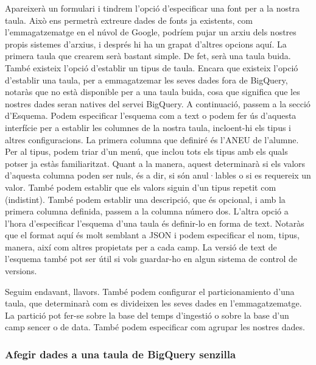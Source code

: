 \documentclass[12pt,longbibliography]{article}
\theoremstyle{definition}
\theoremstyle{remark}
\begin{document}
Apareixerà un formulari i tindrem l'opció d'especificar una font per a la nostra taula. Això ens permetrà extreure dades de fonts ja existents, com l'emmagatzematge en el núvol de Google, podríem pujar un arxiu dels nostres propis sistemes d'arxius, i després hi ha un grapat d'altres opcions aquí. La primera taula que crearem serà bastant simple. De fet, serà una taula buida. També existeix l'opció d'establir un tipus de taula. Encara que existeix l'opció d'establir una taula, per a emmagatzemar les seves dades fora de BigQuery, notaràs que no està disponible per a una taula buida, cosa que significa que les nostres dades seran natives del servei BigQuery. A continuació, passem a la secció d'Esquema. Podem especificar l'esquema com a text o podem fer ús d'aquesta interfície per a establir les columnes de la nostra taula, incloent-hi els tipus i altres configuracions. La primera columna que definiré és l'ANEU de l'alumne. Per al tipus, podem triar d'un menú, que inclou tots els tipus amb els quals potser ja estàs familiaritzat. Quant a la manera, aquest determinarà si els valors d'aquesta columna poden ser nuls, és a dir, si són anul·lables o si es requereix un valor. També podem establir que els valors siguin d'un tipus repetit com (indistint). També podem establir una descripció, que és opcional, i amb la primera columna definida, passem a la columna número dos. L'altra opció a l'hora d'especificar l'esquema d'una taula és definir-lo en forma de text. Notaràs que el format aquí és molt semblant a JSON i podem especificar el nom, tipus, manera, així com altres propietats per a cada camp. La versió de text de l'esquema també pot ser útil si vols guardar-ho en algun sistema de control de versions.

Seguim endavant, llavors. També podem configurar el particionamiento d'una taula, que determinarà com es divideixen les seves dades en l'emmagatzematge. La partició pot fer-se sobre la base del temps d'ingestió o sobre la base d'un camp sencer o de data. També podem especificar com agrupar les nostres dades.

\subsubsection{Afegir dades a una taula de BigQuery senzilla}
\end{document}
